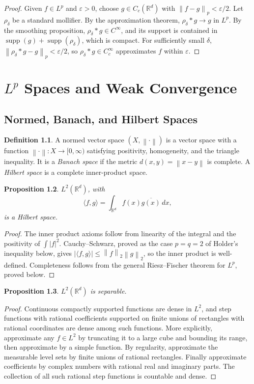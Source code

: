 \documentclass[11pt,openany]{book}
\numberwithin{equation}{chapter}
\theoremstyle{definition}
\newtheorem{definition}{Definition}[chapter]
\theoremstyle{plain}
\newtheorem{proposition}[definition]{Proposition}
\theoremstyle{remark}
\newcommand{\R}{\mathbb{R}}
\newcommand{\eps}{\varepsilon}
\newcommand{\1}{\mathbf{1}}
\newcommand{\dd}{\,d}
\newcommand{\abs}[1]{\left\lvert #1\right\rvert}
\newcommand{\norm}[1]{\left\lVert #1\right\rVert}
\newcommand{\supp}{\operatorname{supp}}
\begin{document}
\begin{proof}
Given \(f\in L^p\) and \(\eps>0\), choose \(g\in C_c(\R^d)\) with \(\norm{f-g}_p<\eps/2\).  Let \(\rho_\delta\) be a standard mollifier.  By the approximation theorem, \(\rho_\delta*g\to g\) in \(L^p\).  By the smoothing proposition, \(\rho_\delta*g\in C^\infty\), and its support is contained in \(\supp(g)+\supp(\rho_\delta)\), which is compact.  For sufficiently small \(\delta\), \(\norm{\rho_\delta*g-g}_p<\eps/2\), so \(\rho_\delta*g\in C_c^\infty\) approximates \(f\) within \(\eps\).
\end{proof}

\chapter{\texorpdfstring{$L^p$}{Lp} Spaces and Weak Convergence}

\section{Normed, Banach, and Hilbert Spaces}

\begin{definition}
A normed vector space \((X,\norm{\cdot})\) is a vector space with a function \(\norm{\cdot}:X\to[0,\infty)\) satisfying positivity, homogeneity, and the triangle inequality.  It is a \emph{Banach space} if the metric \(d(x,y)=\norm{x-y}\) is complete.  A \emph{Hilbert space} is a complete inner-product space.
\end{definition}

\begin{proposition}
\(L^2(\R^d)\), with
\[
    \langle f,g\rangle=\int_{\R^d}f(x)\overline{g(x)}\dd x,
\]
is a Hilbert space.
\end{proposition}

\begin{proof}
The inner product axioms follow from linearity of the integral and the positivity of \(\int\abs f^2\).  Cauchy--Schwarz, proved as the case \(p=q=2\) of Holder's inequality below, gives \(\abs{\langle f,g\rangle}\le\norm f_2\norm g_2\), so the inner product is well-defined.  Completeness follows from the general Riesz--Fischer theorem for \(L^p\), proved below.
\end{proof}

\begin{proposition}
\(L^2(\R^d)\) is separable.
\end{proposition}

\begin{proof}
Continuous compactly supported functions are dense in \(L^2\), and step functions with rational coefficients supported on finite unions of rectangles with rational coordinates are dense among such functions.  More explicitly, approximate any \(f\in L^2\) by truncating it to a large cube and bounding its range, then approximate by a simple function.  By regularity, approximate the measurable level sets by finite unions of rational rectangles.  Finally approximate coefficients by complex numbers with rational real and imaginary parts.  The collection of all such rational step functions is countable and dense.
\end{proof}
\end{document}
